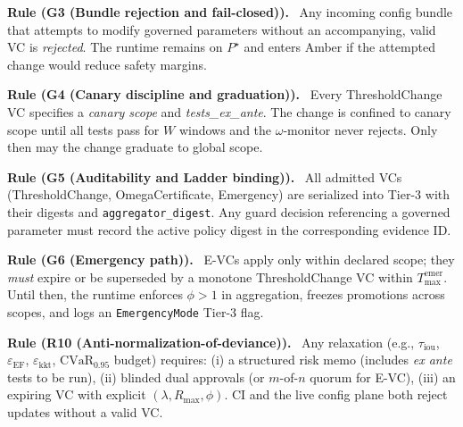 \documentclass[10pt]{article}
\newenvironment{rulex}[1]{\begin{rulebox}\noindent\textbf{Rule (#1).}\ }{\end{rulebox}}
\newcommand{\constsymEFeps}{\varepsilon_{\mathrm{EF}}} %
\newcommand{\epsEF}{\constsymEFeps}
\begin{document}
\begin{rulex}{G3 (Bundle rejection and fail-closed)}
Any incoming config bundle that attempts to modify governed parameters without an accompanying, valid VC
is \emph{rejected}. The runtime remains on $P^\star$ and enters \textsf{Amber} if the attempted change would reduce safety margins.
\end{rulex}

\begin{rulex}{G4 (Canary discipline and graduation)}
Every ThresholdChange VC specifies a \emph{canary scope} and \emph{tests\_ex\_ante}. The change is confined to canary scope until
all tests pass for $W$ windows and the $\omega$-monitor never rejects. Only then may the change graduate to global scope.
\end{rulex}

\begin{rulex}{G5 (Auditability and Ladder binding)}
All admitted VCs (ThresholdChange, OmegaCertificate, Emergency) are serialized into Tier-3 with their digests and \texttt{aggregator\_digest}.
Any guard decision referencing a governed parameter must record the active policy digest in the corresponding evidence ID.
\end{rulex}

\begin{rulex}{G6 (Emergency path)}
E-VCs apply only within declared scope; they \emph{must} expire or be superseded by a monotone ThresholdChange VC within $T_{\mathrm{max}}^{\mathrm{emer}}$.
Until then, the runtime enforces $\phi{>}1$ in aggregation, freezes promotions across scopes, and logs an \texttt{EmergencyMode} Tier-3 flag.
\end{rulex}

\begin{rulex}{R10 (Anti-normalization-of-deviance)}
Any relaxation (e.g., $\tau_{\mathrm{iou}}$, $\epsEF$, $\varepsilon_{\mathrm{kkt}}$, $\mathrm{CVaR}_{0.95}$ budget) requires:
(i) a structured risk memo (includes \emph{ex ante} tests to be run),
(ii) blinded dual approvals (or $m$-of-$n$ quorum for E-VC),
(iii) an expiring VC with explicit $(\lambda,R_{\max},\phi)$.
CI and the live config plane both reject updates without a valid VC.
\end{rulex}

\end{document}
